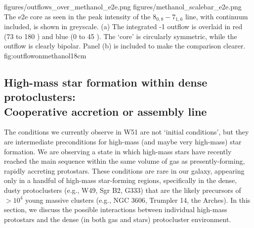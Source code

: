 \documentclass[twocolumn]{aastex61}
\begin{document}
 
\FigureTwo
{figures/outflows_over_methanol_e2e.png}
{figures/methanol_scalebar_e2e.png}
{The e2e core as seen in the peak intensity of the \methanol $8_{0,8}-7_{1,6}$
line, with continuum included, is shown in greyscale.
(a) The integrated -1 outflow is overlaid in red (73 to 180 \kms)
and blue (0 to 45 \kms).  The `core' is circularly symmetric, while the outflow
is clearly bipolar. Panel (b) is included to make the comparison clearer.}
{fig:outflowonmethanol}{1}{8cm}


\subsection{High-mass star formation within dense protoclusters:\\
Cooperative accretion or assembly line}
\label{sec:cooperative}
The conditions we currently observe in W51 are not `initial conditions', but
they are intermediate preconditions for high-mass (and maybe very high-mass)
star formation.  We are observing a state in which high-mass stars have
recently reached the main sequence within the same volume of gas as
presently-forming, rapidly accreting protostars.  These conditions are rare in
our galaxy, appearing only in a handful of high-mass star-forming regions,
specifically in the dense, dusty protoclusters (e.g., W49, Sgr B2, G333) that
are the likely precursors of $>10^4$ \msun young massive clusters (e.g., NGC
3606, Trumpler 14, the Arches).  In this section, we discuss the possible
interactions between individual high-mass protostars and the dense (in both gas
and stars) protocluster environment.

\end{document}
